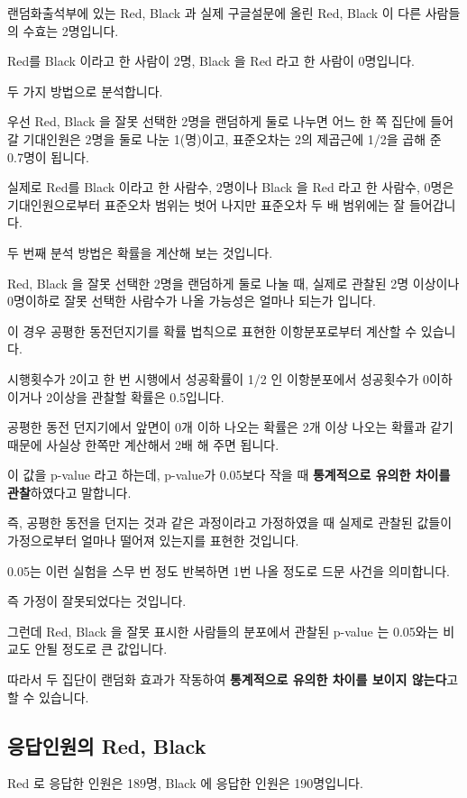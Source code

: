 \documentclass[
]{book}
\begin{document}
랜덤화출석부에 있는 Red, Black 과 실제 구글설문에 올린 Red, Black 이 다른 사람들의 수효는 2명입니다.

Red를 Black 이라고 한 사람이 2명, Black 을 Red 라고 한 사람이 0명입니다.

두 가지 방법으로 분석합니다.

우선 Red, Black 을 잘못 선택한 2명을 랜덤하게 둘로 나누면 어느 한 쪽 집단에 들어갈 기대인원은 2명을 둘로 나눈 1(명)이고, 표준오차는 2의 제곱근에 1/2을 곱해 준 0.7명이 됩니다.

실제로 Red를 Black 이라고 한 사람수, 2명이나 Black 을 Red 라고 한 사람수, 0명은 기대인원으로부터 표준오차 범위는 벗어 나지만 표준오차 두 배 범위에는 잘 들어갑니다.

두 번째 분석 방법은 확률을 계산해 보는 것입니다.

Red, Black 을 잘못 선택한 2명을 랜덤하게 둘로 나눌 때, 실제로 관찰된 2명 이상이나 0명이하로 잘못 선택한 사람수가 나올 가능성은 얼마나 되는가 입니다.

이 경우 공평한 동전던지기를 확률 법칙으로 표현한 이항분포로부터 계산할 수 있습니다.

시행횟수가 2이고 한 번 시행에서 성공확률이 1/2 인 이항분포에서 성공횟수가 0이하이거나 2이상을 관찰할 확률은 0.5입니다.

공평한 동전 던지기에서 앞면이 0개 이하 나오는 확률은 2개 이상 나오는 확률과 같기 때문에 사실상 한쪽만 계산해서 2배 해 주면 됩니다.

이 값을 p-value 라고 하는데, p-value가 0.05보다 작을 때 \textbf{통계적으로 유의한 차이를 관찰}하였다고 말합니다.

즉, 공평한 동전을 던지는 것과 같은 과정이라고 가정하였을 때 실제로 관찰된 값들이 가정으로부터 얼마나 떨어져 있는지를 표현한 것입니다.

0.05는 이런 실험을 스무 번 정도 반복하면 1번 나올 정도로 드문 사건을 의미합니다.

즉 가정이 잘못되었다는 것입니다.

그런데 Red, Black 을 잘못 표시한 사람들의 분포에서 관찰된 p-value 는 0.05와는 비교도 안될 정도로 큰 값입니다.

따라서 두 집단이 랜덤화 효과가 작동하여 \textbf{통계적으로 유의한 차이를 보이지 않는다}고 할 수 있습니다.

\subsection{응답인원의 Red, Black}\label{uxc751uxb2f5uxc778uxc6d0uxc758-red-black-5}

Red 로 응답한 인원은 189명, Black 에 응답한 인원은 190명입니다.
\end{document}
